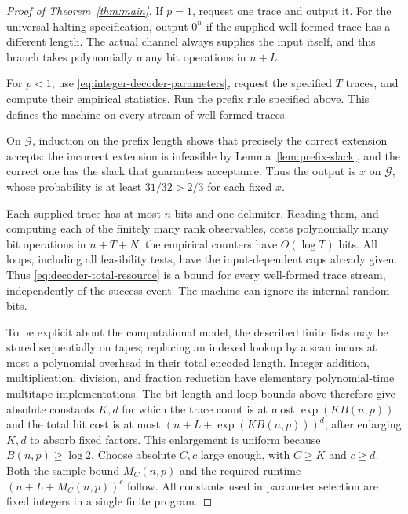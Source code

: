 \begin{proof}[Proof of Theorem~\ref{thm:main}]
If \(p=1\), request one trace and output it.  For the universal
halting specification, output \(0^n\) if the supplied well-formed
trace has a different length.  The actual channel always supplies
the input itself, and this branch takes polynomially many bit
operations in \(n+L\).

For \(p<1\), use \eqref{eq:integer-decoder-parameters}, request the
specified \(T\) traces, and compute their empirical statistics.
Run the prefix rule specified above.  This defines the machine on
every stream of well-formed traces.

On \(\mathcal G\), induction on the prefix length shows that
precisely the correct extension accepts: the incorrect extension
is infeasible by Lemma~\ref{lem:prefix-slack}, and the correct one
has the slack that guarantees acceptance.  Thus the output is \(x\)
on \(\mathcal G\), whose probability is at least \(31/32>2/3\) for
each fixed \(x\).

Each supplied trace has at most \(n\) bits and one delimiter.
Reading them, and computing each of the finitely many rank
observables, costs polynomially many bit operations in \(n+T+N\);
the empirical counters have \(O(\log T)\) bits.  All loops, including
all feasibility tests, have the input-dependent caps already given.
Thus \eqref{eq:decoder-total-resource} is a bound for every
well-formed trace stream, independently of the success event.
The machine can ignore its internal random bits.

To be explicit about the computational model, the described finite
lists may be stored sequentially on tapes; replacing an indexed
lookup by a scan incurs at most a polynomial overhead in their
total encoded length.  Integer addition, multiplication, division,
and fraction reduction have elementary polynomial-time multitape
implementations.  The bit-length and loop bounds above therefore
give absolute constants \(K,d\) for which the trace count is at most
\(\exp(KB(n,p))\) and the total bit cost is at most
\((n+L+\exp(KB(n,p)))^d\), after enlarging \(K,d\) to absorb fixed
factors.  This enlargement is uniform because \(B(n,p)\ge\log2\).
Choose absolute \(C,c\) large enough, with \(C\ge K\) and \(c\ge d\).
Both the sample bound \(M_C(n,p)\) and the required runtime
\((n+L+M_C(n,p))^c\) follow.  All constants used in parameter
selection are fixed integers in a single finite program.
\end{proof}
